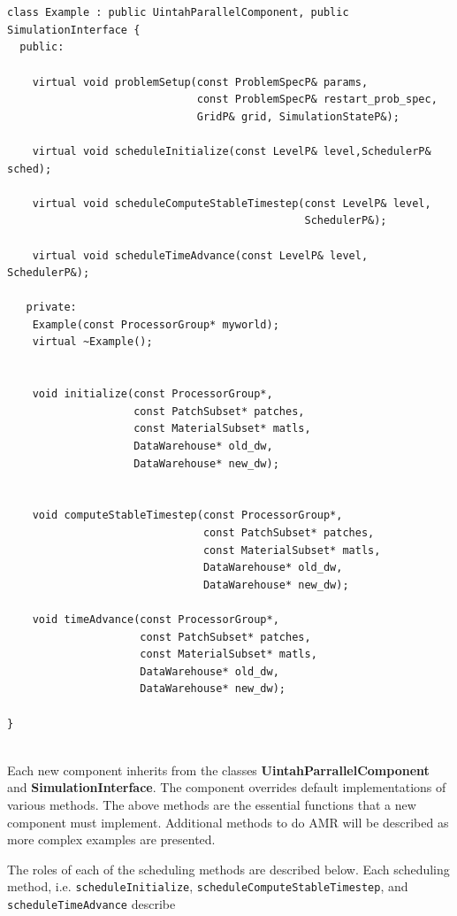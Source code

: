 \documentclass[12pt]{report}
\begin{document}
\begin{Verbatim}[fontsize=\footnotesize]


class Example : public UintahParallelComponent, public SimulationInterface {
  public:

    virtual void problemSetup(const ProblemSpecP& params, 
                              const ProblemSpecP& restart_prob_spec, 
                              GridP& grid, SimulationStateP&);

    virtual void scheduleInitialize(const LevelP& level,SchedulerP& sched);
                                    
    virtual void scheduleComputeStableTimestep(const LevelP& level, 
                                               SchedulerP&);
                                               
    virtual void scheduleTimeAdvance(const LevelP& level, SchedulerP&);

   private:
    Example(const ProcessorGroup* myworld);
    virtual ~Example();


    void initialize(const ProcessorGroup*,
                    const PatchSubset* patches, 
                    const MaterialSubset* matls,
                    DataWarehouse* old_dw, 
                    DataWarehouse* new_dw);
                    
                    
    void computeStableTimestep(const ProcessorGroup*,
                               const PatchSubset* patches,
                               const MaterialSubset* matls,
                               DataWarehouse* old_dw,
                               DataWarehouse* new_dw);
                               
    void timeAdvance(const ProcessorGroup*,
                     const PatchSubset* patches,
                     const MaterialSubset* matls,
                     DataWarehouse* old_dw,
                     DataWarehouse* new_dw);

}


\end{Verbatim}


Each new component inherits from the classes
\textbf{UintahParrallelComponent} and \textbf{SimulationInterface}.
The component overrides default implementations of various methods.
The above methods are the essential functions that a new component
must implement.  Additional methods to do AMR will be described as
more complex examples are presented.

The roles of each of the scheduling methods are described below.  Each
scheduling method, i.e. \texttt{scheduleInitialize},
\texttt{scheduleComputeStableTimestep}, and
\texttt{scheduleTimeAdvance} describe
\end{document}
